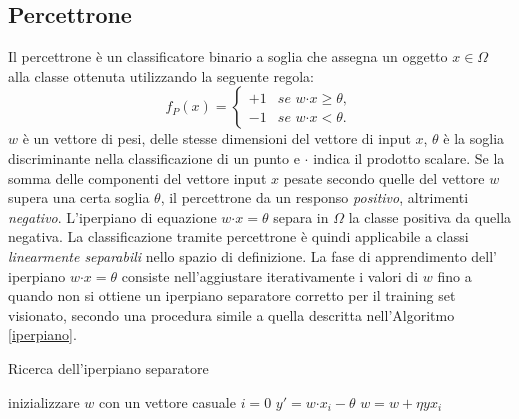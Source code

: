 \documentclass [11pt,a4paper,twoside,openright] {book}
\begin{document}
\subsection{Percettrone}
Il percettrone \cite{rosenblatt1958perceptron} è un classificatore binario a soglia che assegna un oggetto $x \in \Omega$ alla classe ottenuta utilizzando la seguente regola:
\begin{equation}
f_P(x)=
\begin{cases}
+1 & \textit{se } w \boldsymbol{\cdot} x \geq \theta, \\
-1 & \textit{se } w \boldsymbol{\cdot} x < \theta.
\end{cases}
\end{equation}
$w$ è un vettore di pesi, delle stesse dimensioni del vettore di input $x$, $\theta$ è la soglia discriminante nella classificazione di un punto e $\boldsymbol{\cdot}$ indica il prodotto scalare. Se la somma delle componenti del vettore input $x$ pesate secondo quelle del vettore $w$ supera una certa soglia $\theta$, il percettrone da un responso \textit{positivo}, altrimenti \textit{negativo}. L'iperpiano di equazione $w \boldsymbol{\cdot} x = \theta$ separa in $\Omega$ la classe positiva da quella negativa. La classificazione tramite percettrone è quindi applicabile a classi \textit{linearmente separabili} nello spazio di definizione. La fase di apprendimento dell' iperpiano $w \boldsymbol{\cdot} x = \theta$ consiste nell'aggiustare iterativamente i valori di $w$ fino a quando non si ottiene un iperpiano separatore corretto per il training set visionato, secondo una procedura simile a quella descritta nell'Algoritmo \ref{iperpiano}.
\begin{algorithm}
\caption{Ricerca dell'iperpiano separatore}\label{iperpiano}
\begin{algorithmic}[1]
\State inizializzare $w$ con un vettore casuale
	\State $i=0$
		\State $y' = w \boldsymbol{\cdot} x_i - \theta$
		 $w = w + \eta y x_i$ \EndIf
	\EndWhile
\EndWhile
\end{algorithmic}
\end{algorithm}
\end{document}

